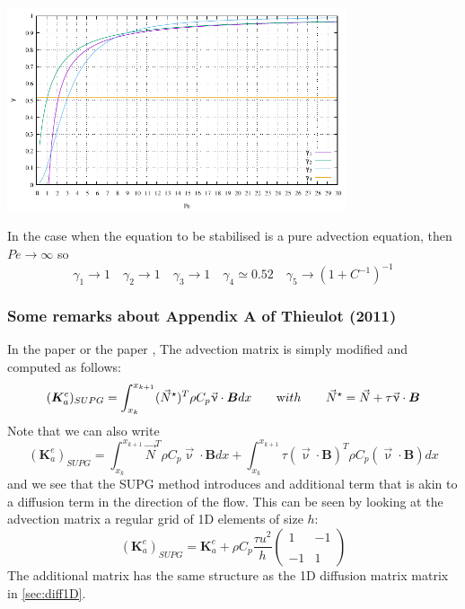 \begin{center}
\includegraphics[width=10cm]{images/supg/gamma} 
\end{center}

In the case when the equation to be stabilised is a pure advection equation, 
then $Pe\rightarrow \infty$ so 
\[
\gamma_1 \rightarrow 1  \quad
\gamma_2 \rightarrow 1 \quad
\gamma_3 \rightarrow 1 \quad
\gamma_4 \simeq 0.52 \quad
\gamma_5 \rightarrow (1+C^{-1})^{-1} 
\]






\subsubsection{Some remarks about Appendix A of Thieulot (2011) \cite{thie11}}


In the \douar paper \cite{brtf08} or the \fantom paper \cite{thie11},
The advection matrix is simply modified and computed as follows:
\[
({\bm K}_a^e)_{SUPG}
=
\int_{x_k}^{x_{k+1}}   ({\vec N}^\star)^T \rho C_p \vec\upnu \cdot {\bm B} dx  
\quad\quad
{\text with}
\quad\quad
{\vec N}^\star= {\vec N} + \tau \vec \upnu \cdot {\bm B}
\]
Note that we can also write 
\[
({\bm K}_a^e)_{SUPG}
=
\int_{x_k}^{x_{k+1}}   {\vec N}^T \rho C_p \vec\upnu \cdot {\bm B} dx  
+
\int_{x_k}^{x_{k+1}}  \tau (\vec \upnu \cdot {\bm B})^T   \rho C_p (\vec\upnu \cdot {\bm B}) dx  
\]
and we see that the SUPG method introduces and additional term that is akin to 
a diffusion term in the direction of the flow.
This can be seen by looking at the advection matrix a regular grid of 1D 
elements of size $h$:
\[
({\bm K}_a^e)_{SUPG}=
{\bm K}_a^e
+
\rho C_p
\frac{\tau u^2}{h}
\left(
\begin{array}{cc}
1 & -1 \\ \\
-1 & 1
\end{array}
\right)
\]
The additional matrix has the same structure as the 1D diffusion matrix matrix in \ref{sec:diff1D}.

